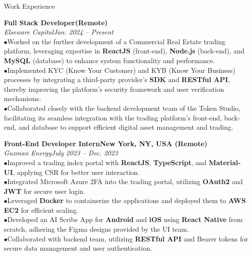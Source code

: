 \documentclass{resume} %
\begin{document}
\begin{rSection}{Work Experience}

{\bf Full Stack Developer}\hfill{\textbf{(Remote)}}
\\{\em Elseware Capital}\hfill {\em Jan. 2024 -- Present}
\\ $ \bullet $Worked on the further development of a Commercial Real Estate trading platform, leveraging expertise in \textbf{ReactJS} (front-end), \textbf{Node.js} (back-end), and \textbf{MySQL} (database) to enhance system functionality and performance.
\\ $ \bullet $Implemented KYC (Know Your Customer) and KYB (Know Your Business) processes by integrating a third-party provider's \textbf{SDK} and \textbf{RESTful API}, thereby improving the platform's security framework and user verification mechanisms.
\\ $ \bullet $Collaborated closely with the backend development team of the Token Studio, facilitating its seamless integration with the trading platform's front-end, back-end, and database to support efficient digital asset management and trading.

{\bf Front-End Developer Intern}\hfill{\textbf{New York, NY, USA (Remote)}}
\\{\em Guzman Energy}\hfill {\em July 2023 -- Dec. 2023}
\\ $ \bullet $Improved a trading index portal with \textbf{ReactJS}, \textbf{TypeScript}, and \textbf{Material-UI}, applying CSR for better user interaction.
\\ $ \bullet $Integrated Microsoft Azure 2FA into the trading portal, utilizing \textbf{OAuth2} and \textbf{JWT} for secure user login.
\\ $ \bullet $Leveraged \textbf{Docker} to containerize the applications and deployed them to \textbf{AWS EC2} for efficient scaling.
\\ $ \bullet $Developed an AI Scribe App for \textbf{Android} and \textbf{iOS} using \textbf{React Native} from scratch, adhering the Figma designs provided by the UI team.
\\ $ \bullet $Collaborated with backend team, utilizing \textbf{RESTful API} and Bearer tokens for secure data management and user authentication.


\end{rSection}
\end{document}
